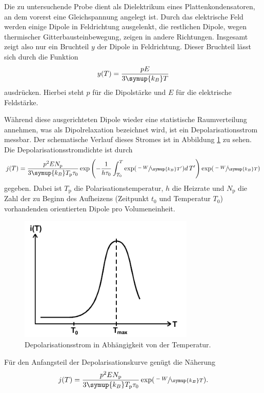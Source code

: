 Die zu untersuchende Probe dient als Dielektrikum eines Plattenkondensatoren, an dem vorerst eine Gleichspannung angelegt ist.
Durch das elektrische Feld werden einige Dipole in Feldrichtung ausgelenkt, die restlichen Dipole, wegen thermischer Gitterbausteinbewegung, zeigen
in andere Richtungen. Insgesamt zeigt also nur ein Bruchteil $y$ der Dipole in Feldrichtung.
Dieser Bruchteil lässt sich durch die Funktion
\begin{equation}
    y(T)=\frac{pE}{3\symup{k_B}T}
\end{equation}
ausdrücken.
Hierbei steht $p$ für die Dipolstärke und $E$ für die elektrische Feldstärke.

Während diese ausgerichteten Dipole wieder eine statistische Raumverteilung annehmen, was als Dipolrelaxation bezeichnet wird, ist ein Depolarisationsstrom messbar.
Der schematische Verlauf dieses Stromes ist in Abbildung \ref{fig:Strom} zu sehen.
Die Depolarisationsstromdichte ist durch
\begin{equation}
\label{eqn:Stromdichte}
    j(T)=\frac{p^2 E N_\text{p}}{3 \symup{k_B} T_\text{p}\tau_0}\exp\left(-\frac{1}{h\tau_0}\int_{T_0}^{T}\exp(\sfrac{-W}{\symup{k_B}T'})d\,T'\right)\exp(\sfrac{-W}{\symup{k_B}T})
\end{equation}
gegeben.
Dabei ist $T_\text{p}$ die Polarisationstemperatur, $h$ die Heizrate und $N_\text{p}$ die Zahl der zu Beginn des Aufheizens (Zeitpunkt $t_0$ und Temperatur $T_0$) vorhandenden orientierten Dipole pro Volumeneinheit.
\begin{figure}[htb]
    \centering
    \includegraphics[height=6cm]{pics/Strom.png}
    \caption{Depolarisationsstrom in Abhängigkeit von der Temperatur. \cite{anleitung}}
    \label{fig:Strom}
\end{figure}
\FloatBarrier
Für den Anfangsteil der Depolarisationskurve genügt die Näherung
\begin{equation}
    j(T)=\frac{p^2 E N_\text{p}}{3 \symup{k_B} T_\text{p}\tau_0}\exp(\sfrac{-W}{\symup{k_B}T}).    
\end{equation}
